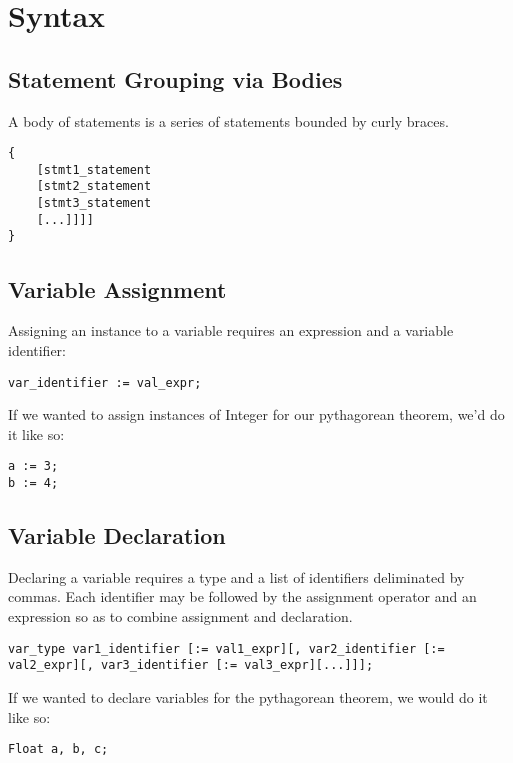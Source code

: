 \section{Syntax}
\subsection{Statement Grouping via Bodies}
A body of statements is a series of statements bounded by curly braces.

\begin{lstlisting}
{
	[stmt1_statement
	[stmt2_statement
	[stmt3_statement
	[...]]]]
}
\end{lstlisting}

\subsection{Variable Assignment}
Assigning an instance to a variable requires an expression and a variable identifier:

\begin{lstlisting}
var_identifier := val_expr;
\end{lstlisting}

If we wanted to assign instances of Integer for our pythagorean theorem, we'd do it like so:

\begin{lstlisting}[caption=Variable Assignment for the Pythagorean Theorem]
a := 3;
b := 4;
\end{lstlisting}

\subsection{Variable Declaration}
Declaring a variable requires a type and a list of identifiers deliminated by commas. Each identifier may be followed by the assignment operator and an expression so as to combine assignment and declaration.

\begin{lstlisting}
var_type var1_identifier [:= val1_expr][, var2_identifier [:= val2_expr][, var3_identifier [:= val3_expr][...]]];
\end{lstlisting}

If we wanted to declare variables for the pythagorean theorem, we would do it like so:

\begin{lstlisting}[caption=Variable Initialization for the Pythagorean Theorem]
Float a, b, c;
\end{lstlisting}

